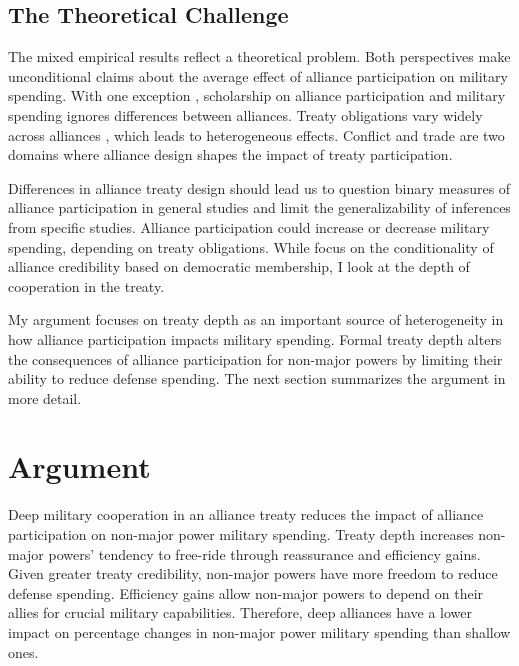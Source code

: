 \documentclass[12pt]{article}
\begin{document}
\subsection{The Theoretical Challenge}


The mixed empirical results reflect a theoretical problem. 
Both perspectives make unconditional claims about the average effect of alliance participation on military spending.  
With one exception \citep{DigiuseppePoast2016}, scholarship on alliance participation and military spending ignores differences between alliances.
Treaty obligations vary widely across alliances \citep{Leedsetal2002}, which leads to heterogeneous effects. 
Conflict \citep{Leeds2003, Benson2012} and trade \citep{Long2003, LongLeeds2006} are two domains where alliance design shapes the impact of treaty participation. 


Differences in alliance treaty design should lead us to question binary measures of alliance participation in general studies and limit the generalizability of inferences from specific studies. 
Alliance participation could increase or decrease military spending, depending on treaty obligations. 
While \citet{DigiuseppePoast2016} focus on the conditionality of alliance credibility based on democratic membership, I look at the depth of cooperation in the treaty. 


My argument focuses on treaty depth as an important source of heterogeneity in how alliance participation impacts military spending. 
Formal treaty depth alters the consequences of alliance participation for non-major powers by limiting their ability to reduce defense spending. 
The next section summarizes the argument in more detail. 



\section{Argument}

Deep military cooperation in an alliance treaty reduces the impact of alliance participation on non-major power military spending.
Treaty depth increases non-major powers' tendency to free-ride through reassurance and efficiency gains. 
Given greater treaty credibility, non-major powers have more freedom to reduce defense spending.
Efficiency gains allow non-major powers to depend on their allies for crucial military capabilities.   
Therefore, deep alliances have a lower impact on percentage changes in non-major power military spending than shallow ones. 
\end{document}
